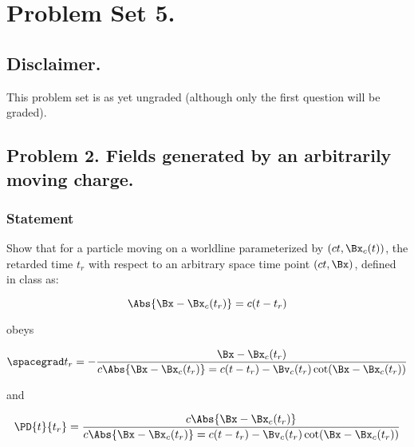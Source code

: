 
%

\chapter{Problem Set 5.}
\label{chap:relElectroDynProblemSet5}
\date{Mar 14, 2011}

\beginArtWithToc

\section{Disclaimer.}

This problem set is as yet ungraded (although only the first question will be graded).



\section{Problem 2.  Fields generated by an arbitrarily moving charge.}

\subsection{Statement}

Show that for a particle moving on a worldline parameterized by $(ct, \Bx_c(t))$, the retarded time $t_r$ with respect to an arbitrary space time point $(ct, \Bx)$, defined in class as:

\begin{equation}\label{eqn:relElectroDynProblemSet5:10}
\Abs{\Bx - \Bx_c(t_r)} = c(t - t_r)
\end{equation}

obeys 

\begin{equation}\label{eqn:relElectroDynProblemSet5:30}
\spacegrad t_r = -\frac{\Bx - \Bx_c(t_r)}{
c \Abs{\Bx - \Bx_c(t_r)} = c(t - t_r) - \Bv_c(t_r) \cot (\Bx - \Bx_c(t_r))
}
\end{equation}

and

\begin{equation}\label{eqn:relElectroDynProblemSet5:50}
\PD{t}{t_r} = \frac{c \Abs{\Bx - \Bx_c(t_r)}}{
c \Abs{\Bx - \Bx_c(t_r)} = c(t - t_r) - \Bv_c(t_r) \cot (\Bx - \Bx_c(t_r))
}
\end{equation}

